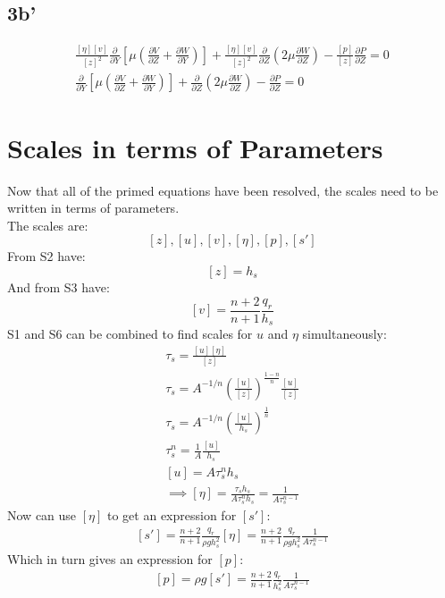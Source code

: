 \documentclass[10pt, letterpaper, twoside]{article}
\newcommand{\pd}[2]{\frac{\partial#1}{\partial#2}}
\begin{document}
	\subsection{3b'}
	\begin{gather*}
		\frac{\left[\eta\right]\left[v\right]}{\left[z\right]^2}\pd{}{Y}\left[\mu\left(\pd{V}{Z}+\pd{W}{Y}\right)\right] + \frac{\left[\eta\right]\left[v\right]}{\left[z\right]^2}\pd{}{Z}\left(2\mu\pd{W}{Z}\right) - \frac{\left[p\right]}{\left[z\right]}\pd{P}{Z} = 0\\
		\pd{}{Y}\left[\mu\left(\pd{V}{Z}+\pd{W}{Y}\right)\right] + \pd{}{Z}\left(2\mu\pd{W}{Z}\right) - \pd{P}{Z} = 0 \tag{23b}
	\end{gather*}
	
	\section{Scales in terms of Parameters}
	Now that all of the primed equations have been resolved, the scales need to be written in terms of parameters.\\
	The scales are:
	\begin{equation*}
		\left[z\right],\left[u\right],\left[v\right],\left[\eta\right],\left[p\right],\left[s'\right]
	\end{equation*}
	From S2 have:
	\begin{equation*}
		\left[z\right] = h_s
	\end{equation*}
	And from S3 have:
	\begin{equation*}
		\left[v\right] = \frac{n+2}{n+1}\frac{q_r}{h_s}
	\end{equation*}
	S1 and S6 can be combined to find scales for $ u $ and $ \eta $ simultaneously:
	\begin{gather*}
		\tau_s = \frac{\left[u\right]\left[\eta\right]}{\left[z\right]}\\
		\tau_s = A^{-1/n}\left(\frac{\left[u\right]}{\left[z\right]}\right)^{\frac{1-n}{n}}\frac{\left[u\right]}{\left[z\right]}\\
		\tau_s = A^{-1/n}\left(\frac{\left[u\right]}{h_s}\right)^{\frac{1}{n}}\\
		\tau_s^n = \frac{1}{A}\frac{\left[u\right]}{h_s}\\
		\left[u\right] = A\tau_s^nh_s\\
		\implies \left[\eta\right] = \frac{\tau_sh_s}{A\tau_s^nh_s} = \frac{1}{A\tau_s^{n-1}}
	\end{gather*}
	Now can use $ \left[\eta\right] $ to get an expression for $ \left[s'\right] $:
	\begin{gather*}
		\left[s'\right] = \frac{n+2}{n+1}\frac{q_r}{\rho gh_s^2}\left[\eta\right] = \frac{n+2}{n+1}\frac{q_r}{\rho gh_s^2}\frac{1}{A\tau_s^{n-1}}
	\end{gather*}
	Which in turn gives an expression for $ \left[p\right] $:
	\begin{gather*}
		\left[p\right] = \rho g \left[s'\right] = \frac{n+2}{n+1}\frac{q_r}{h_s^2}\frac{1}{A\tau_s^{n-1}}
	\end{gather*}
	
\end{document}
